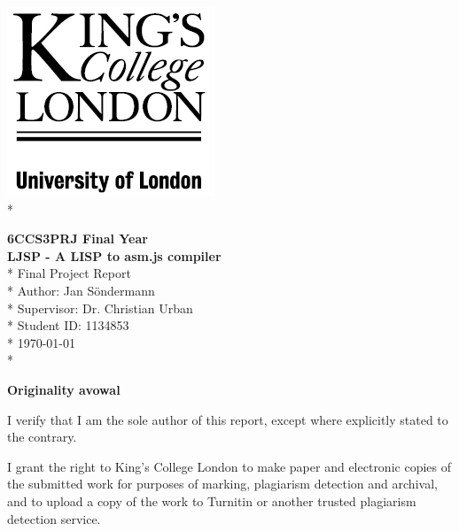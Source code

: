 \documentclass[11pt]{report}
\begin{document}
\thispagestyle{empty}
\begin{center}
    {\large
        \begin{flushright}
              \includegraphics[scale=0.4]{kingslogo.png}\\*
        \end{flushright}
        \vspace*{2.2in}
        {\huge \bf{6CCS3PRJ Final Year\\\vspace{0.2cm}LJSP - A LISP to asm.js compiler}}\\*
        \vspace*{0.4in}
        \Large{Final Project Report}\\*
        \vspace*{1.2in}
        \large{Author: Jan S\"ondermann\\*
                   Supervisor: Dr. Christian Urban}\\*
                   Student ID: 1134853\\*
        \vspace*{0.2in}
        {\today}\\*
    }
\end{center}
\restoregeometry

\begin{center}
\textbf{Originality avowal}
\end{center}

I verify that I am the sole author of this report, except where explicitly stated to the contrary.

I grant the right to King's College London to make paper and electronic copies of the submitted work for purposes of marking, plagiarism detection and archival, and to upload a copy of the work to Turnitin or another trusted plagiarism detection service.\\
\end{document}

